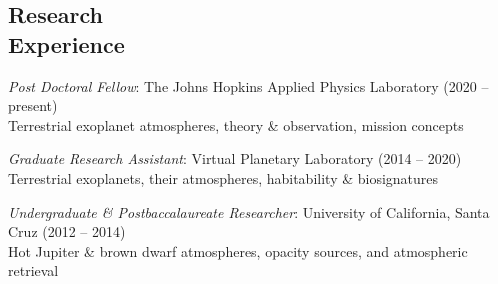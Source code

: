 \documentclass[margin,10pt]{res}
\begin{document}
\begin{resume}
\section{Research \\Experience} 
                {\sl Post Doctoral Fellow}: The Johns Hopkins Applied Physics Laboratory \hfill (2020 -- present)\\
                Terrestrial exoplanet atmospheres, theory \& observation, mission concepts
                
                {\sl Graduate Research Assistant}: Virtual Planetary Laboratory   \hfill (2014 -- 2020)\\
                Terrestrial exoplanets, their atmospheres, habitability \& biosignatures

                {\sl Undergraduate \& Postbaccalaureate Researcher}: University of California, Santa Cruz \hfill          (2012 -- 2014)\\
                Hot Jupiter \& brown dwarf atmospheres, opacity sources, and atmospheric retrieval \\
   

\end{resume}
\end{document}
